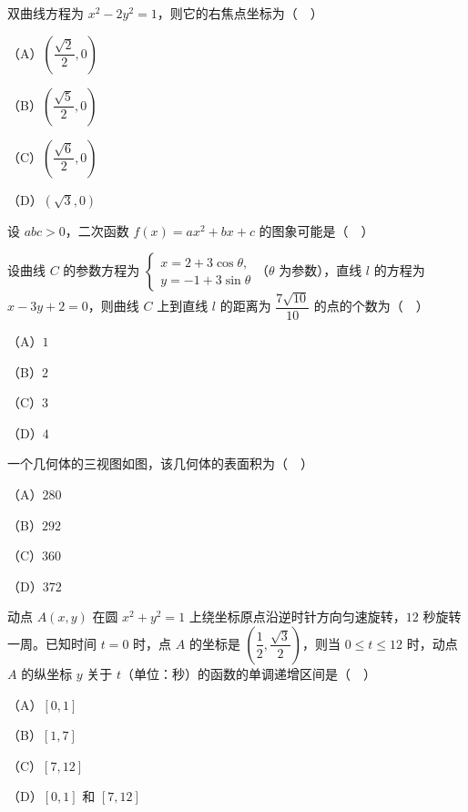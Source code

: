 \begin{question}
双曲线方程为 $x^2-2y^2=1$，则它的右焦点坐标为（　）

（A）$\left(\dfrac{\sqrt2}2,0\right)$

（B）$\left(\dfrac{\sqrt5}2,0\right)$

（C）$\left(\dfrac{\sqrt6}2,0\right)$

（D）$(\sqrt3,0)$

\Needspace{0.4\textheight}
\end{question}
\begingroup
\renewenvironment{question}{\Needspace{0.5\textheight}}{}
\begin{question}
设 $abc>0$，二次函数 $f(x)=ax^2+bx+c$ 的图象可能是（　）
\nopagebreak[4]
\begin{center}\end{center}
\nopagebreak[4]
\end{question}
\endgroup
\begin{question}
设曲线 $C$ 的参数方程为 $\begin{cases}x=2+3\cos\theta,\\ y=-1+3\sin\theta\end{cases}$（$\theta$ 为参数），直线 $l$ 的方程为 $x-3y+2=0$，则曲线 $C$ 上到直线 $l$ 的距离为 $\dfrac{7\sqrt{10}}{10}$ 的点的个数为（　）

（A）$1$

（B）$2$

（C）$3$

（D）$4$

\Needspace{0.4\textheight}
\end{question}
\begingroup
\renewenvironment{question}{\Needspace{0.5\textheight}}{}
\begin{question}
一个几何体的三视图如图，该几何体的表面积为（　）
\nopagebreak[4]
\begin{center}\end{center}
\nopagebreak[4]
（A）$280$

（B）$292$

（C）$360$

（D）$372$

\end{question}
\endgroup
\begin{question}
动点 $A(x,y)$ 在圆 $x^2+y^2=1$ 上绕坐标原点沿逆时针方向匀速旋转，$12$ 秒旋转一周。已知时间 $t=0$ 时，点 $A$ 的坐标是 $\left(\dfrac12,\dfrac{\sqrt3}2\right)$，则当 $0\leqslant t\leqslant12$ 时，动点 $A$ 的纵坐标 $y$ 关于 $t$（单位：秒）的函数的单调递增区间是（　）

（A）$[0,1]$

（B）$[1,7]$

（C）$[7,12]$

（D）$[0,1]$ 和 $[7,12]$

\end{question}
